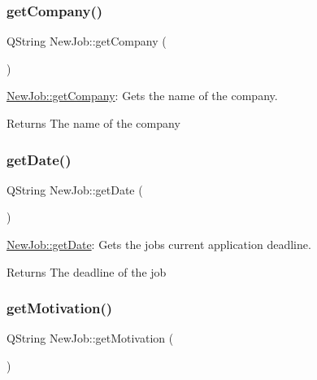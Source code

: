 \subsubsection{\texorpdfstring{get\+Company()}{getCompany()}}
{\footnotesize\ttfamily Q\+String New\+Job\+::get\+Company (\begin{DoxyParamCaption}{ }\end{DoxyParamCaption})}



\mbox{\hyperlink{class_new_job_ad4680ae9c009b90ce751c3c5fe60cdb5}{New\+Job\+::get\+Company}}\+: Gets the name of the company. 

\begin{DoxyReturn}{Returns}
The name of the company 
\end{DoxyReturn}
\mbox{\label{class_new_job_abe92b6bce4e8e3485f59554a2cbad1bc}} 
\subsubsection{\texorpdfstring{get\+Date()}{getDate()}}
{\footnotesize\ttfamily Q\+String New\+Job\+::get\+Date (\begin{DoxyParamCaption}{ }\end{DoxyParamCaption})}



\mbox{\hyperlink{class_new_job_abe92b6bce4e8e3485f59554a2cbad1bc}{New\+Job\+::get\+Date}}\+: Gets the job\textquotesingle{}s current application deadline. 

\begin{DoxyReturn}{Returns}
The deadline of the job 
\end{DoxyReturn}
\mbox{\label{class_new_job_a665113a114684439ed3705c8c5f8eabf}} 
\subsubsection{\texorpdfstring{get\+Motivation()}{getMotivation()}}
{\footnotesize\ttfamily Q\+String New\+Job\+::get\+Motivation (\begin{DoxyParamCaption}{ }\end{DoxyParamCaption})}




